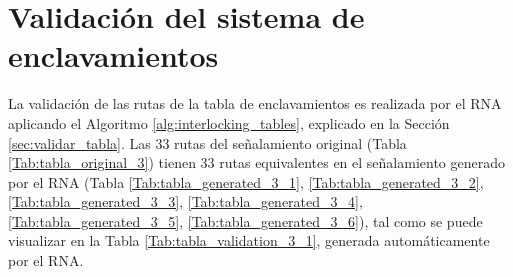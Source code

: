 \section{Validación del sistema de enclavamientos}

	La validación de las rutas de la tabla de enclavamientos es realizada por el RNA aplicando el Algoritmo \ref{alg:interlocking_tables}, explicado en la Sección \ref{sec:validar_tabla}. Las 33 rutas del señalamiento original (Tabla \ref{Tab:tabla_original_3}) tienen 33 rutas equivalentes en el señalamiento generado por el RNA (Tabla \ref{Tab:tabla_generated_3_1}, \ref{Tab:tabla_generated_3_2}, \ref{Tab:tabla_generated_3_3}, \ref{Tab:tabla_generated_3_4}, \ref{Tab:tabla_generated_3_5}, \ref{Tab:tabla_generated_3_6}), tal como se puede visualizar en la Tabla \ref{Tab:tabla_validation_3_1}, generada automáticamente por el RNA. %

